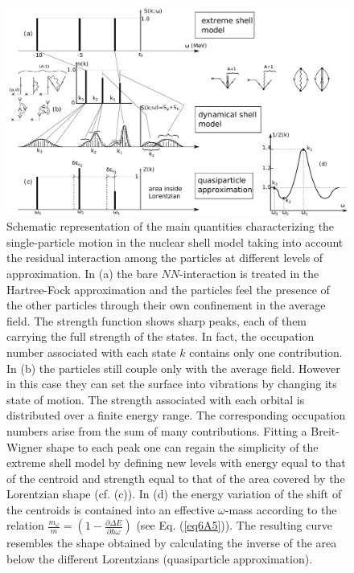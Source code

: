 \begin{subappendices}
        \begin{figure}
        \centerline{\includegraphics*[width=15cm,angle=0]{C6/figs_C6/fig4I1.pdf}}
        	\caption{Schematic representation of the main quantities characterizing the single-particle motion in the nuclear shell model taking into account the residual interaction among the particles at different levels of approximation.
        	In (a) the bare $NN$-interaction is treated in the Hartree-Fock approximation and the particles feel the presence of the other particles through their own confinement in the average field. The strength function shows sharp peaks, each of them carrying the full strength of the states. In fact, the occupation number associated with each state $k$ contains only one contribution. In (b) the particles still couple   only  with the average field. However in this case they can set the surface into vibrations by changing its state of motion. The strength associated with each orbital is distributed over a finite energy range. The corresponding occupation numbers arise from the sum of many contributions. Fitting a Breit-Wigner  shape to each peak one can regain the simplicity of the extreme shell model by defining new levels with energy equal to that of the centroid and strength equal to that of the area covered by the Lorentzian shape (cf. (c)). In (d) the energy variation of the shift of the centroids is contained into an effective $\omega$-mass according to the relation $\frac{m_\omega}{m}=\left(1-\frac{\partial \Delta E}{\partial \hbar \omega}\right)$ (see Eq. (\ref{eq6A5})). The resulting curve resembles the shape obtained by calculating the inverse of the area below the different Lorentzians (quasiparticle approximation).}\label{fig8.F.1}
        \end{figure}



\end{subappendices}

